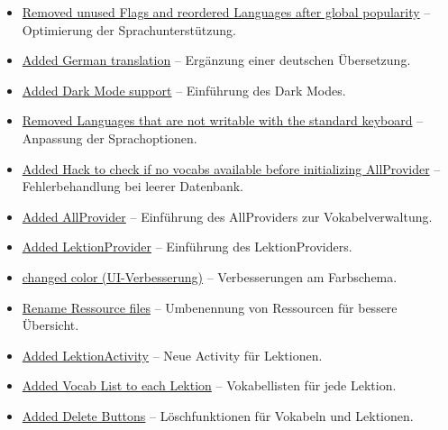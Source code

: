 \documentclass[12pt,a4paper]{article}
\begin{document}
\begin{itemize}
    \item \href{https://github.com/Erik-Donath/Palabra/commit/bd11641738224ec701efae7cd1243153af7b10fe}{Removed unused Flags and reordered Languages after global popularity} -- Optimierung der Sprachunterstützung.
    \item \href{https://github.com/Erik-Donath/Palabra/commit/6e4982769e27744cca8d112e1807f76f4ff160de}{Added German translation} -- Ergänzung einer deutschen Übersetzung.
    \item \href{https://github.com/Erik-Donath/Palabra/commit/4bc28a645fe7c87899ccc57ef4d8a160bfef4d85}{Added Dark Mode support} -- Einführung des Dark Modes.
    \item \href{https://github.com/Erik-Donath/Palabra/commit/bf8beefcf7cca51e4da28855030c7488e79f9806}{Removed Languages that are not writable with the standard keyboard} -- Anpassung der Sprachoptionen.
    \item \href{https://github.com/Erik-Donath/Palabra/commit/3b6bec27e538deed545c870dd79b3046855a1120}{Added Hack to check if no vocabs available before initializing AllProvider} -- Fehlerbehandlung bei leerer Datenbank.
    \item \href{https://github.com/Erik-Donath/Palabra/commit/2a7ab3cd174015657479552cb8bf8bb52b9a2f8b}{Added AllProvider} -- Einführung des AllProviders zur Vokabelverwaltung.
    \item \href{https://github.com/Erik-Donath/Palabra/commit/525dcb48f3128b1463a836a1db68a558072ab39c}{Added LektionProvider} -- Einführung des LektionProviders.
    \item \href{https://github.com/Erik-Donath/Palabra/commit/51ced0c599b4e4707231b10cbceea484b169148a}{changed color (UI-Verbesserung)} -- Verbesserungen am Farbschema.
    \item \href{https://github.com/Erik-Donath/Palabra/commit/5cb0c4cd391b8ec789e4889fd4ed4bf5be747797}{Rename Ressource files} -- Umbenennung von Ressourcen für bessere Übersicht.
    \item \href{https://github.com/Erik-Donath/Palabra/commit/b1787998fa5c91b92e6411b9339e7b51cbdd347b}{Added LektionActivity} -- Neue Activity für Lektionen.
    \item \href{https://github.com/Erik-Donath/Palabra/commit/39da77321c858532260274ccc76ad0458cea806d}{Added Vocab List to each Lektion} -- Vokabellisten für jede Lektion.
    \item \href{https://github.com/Erik-Donath/Palabra/commit/7f204528d8f7df18da4316c6c8b84396d3c45299}{Added Delete Buttons} -- Löschfunktionen für Vokabeln und Lektionen.
\end{itemize}
\end{document}
